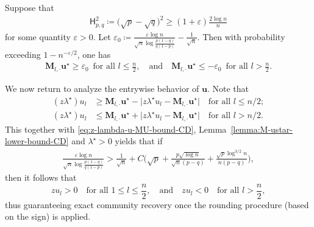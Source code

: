 %
\begin{lemma}
	\label{lemma:M-ustar-lower-bound-CD}
	Suppose that
%
\begin{align}
	\mathsf{H}_{p,q}^{2} \coloneqq \big( \sqrt{p} -\sqrt{q}\big)^2 \geq\left( 1+ \varepsilon  \right) \frac{2\log n}{n} 
	\label{eq:H-pq-lower-bound-lemma}
\end{align}
% 
for some quantity $\varepsilon>0$.  Let $\varepsilon_0 \coloneqq \frac{\varepsilon\log n}{\sqrt{n}\log\frac{p(1-q)}{q(1-p)}}-\frac{1}{\sqrt{n}}$. 
Then with probability exceeding $1-n^{-\varepsilon/2}$, one has
%
\begin{align*}
	 \bm{M}_{l,\cdot}\bm{u}^{\star}   \geq \varepsilon_0 \,\,\,\text{for all }l\leq \frac{n}{2},
	\quad\text{and}\quad
	   \bm{M}_{l,\cdot} \bm{u}^{\star}  
	\leq - \varepsilon_0 \,\,\, \text{for all } l > \frac{n}{2}. 
\end{align*}
%
\end{lemma}
%

We now return to analyze the entrywise behavior of $\bm{u}$. Note that
%
\begin{align*}
(z\lambda^{\star})u_{l} & \geq\bm{M}_{l,\cdot}\bm{u}^{\star}-\big| z\lambda^{\star}u_{l}-\bm{M}_{l,\cdot}\bm{u}^{\star}\big|  \quad\text{for all } l\leq n/2;\\
(z\lambda^{\star})u_{l} & \leq\bm{M}_{l,\cdot}\bm{u}^{\star}+\big| z\lambda^{\star}u_{l}-\bm{M}_{l,\cdot}\bm{u}^{\star}\big|  \quad\text{for all }l>n/2.
\end{align*}
%
This together with \eqref{eq:z-lambda-u-MU-bound-CD}, Lemma~\ref{lemma:M-ustar-lower-bound-CD} and $\lambda^{\star}>0$ yields that if
%
\begin{align}
	\frac{\varepsilon\log n}{\sqrt{n}\log\frac{p(1-q)}{q(1-p)}}  > \frac{1}{\sqrt{n}} 
	+  C \Big( \sqrt{p} + \frac{p\sqrt{\log n}}{\sqrt{n}(p-q)} + \frac{\sqrt{p}\log^{3/2}n}{n(p-q)} \Big), 
	\label{eq:epsilon-condition-CD-inf-123}
\end{align}
%
then it follows that
%
\[
zu_{l}>0\quad\text{for all }1\leq l\leq\frac{n}{2},\quad\text{and}\quad zu_{l}<0\quad\text{for all }l>\frac{n}{2},
\]
%
thus guaranteeing exact community recovery once the rounding procedure (based on the sign) is applied.  


